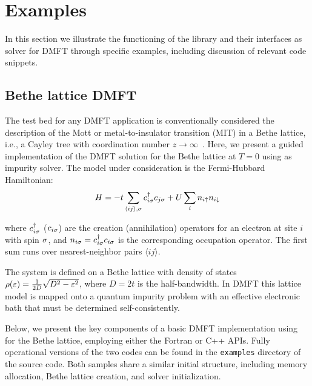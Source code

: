 \documentclass[edipack2.tex]{subfiles}
\begin{document}
\section{Examples}\label{SecExamples}
In this section we illustrate the functioning of the \NAME
library and their interfaces as solver for DMFT through specific examples, including
discussion of relevant code snippets. 


\subsection{Bethe lattice DMFT}\label{SecExamplesBetheDMFT}
The test bed for any DMFT application is conventionally considered 
the description of the Mott or metal-to-insulator transition (MIT) 
in a Bethe lattice, i.e., a Cayley tree with coordination number 
$z\to\infty$~\cite{Georges1996}.
Here, we present a guided implementation of the DMFT 
solution for the Bethe lattice at $T=0$ using \NAME as impurity
solver.
The model under consideration is the Fermi-Hubbard Hamiltonian:
$$
H = -t \sum_{\langle ij\rangle,\sigma} c^\dagger_{i\sigma} c_{j\sigma} + 
    U \sum_i n_{i\uparrow}n_{i\downarrow}
    $$
    
where $c^\dagger_{i\sigma}$ ($c_{i\sigma}$) are the creation (annihilation) 
operators for an electron at site $i$ with spin $\sigma$, and 
$n_{i\sigma} = c^\dagger_{i\sigma} c_{i\sigma}$ is the corresponding occupation 
operator. The first sum runs over nearest-neighbor pairs 
$\langle ij \rangle$.

The system is defined on a Bethe lattice with density of states
$\rho(\varepsilon)=\frac{1}{2D}\sqrt{D^2-\varepsilon^2}$,
where $D=2t$ is the half-bandwidth.
In DMFT this lattice model is mapped onto a quantum impurity problem with 
an effective electronic bath that must be determined
self-consistently.

Below, we present the key components of a basic DMFT implementation 
using \NAME for the Bethe lattice, employing either the Fortran or 
C++ APIs. Fully operational versions of the two codes can be found 
in the {\tt examples} directory of the \NAME source code. Both 
samples share a similar initial structure, including memory 
allocation, Bethe lattice creation, and solver initialization.
\end{document}
